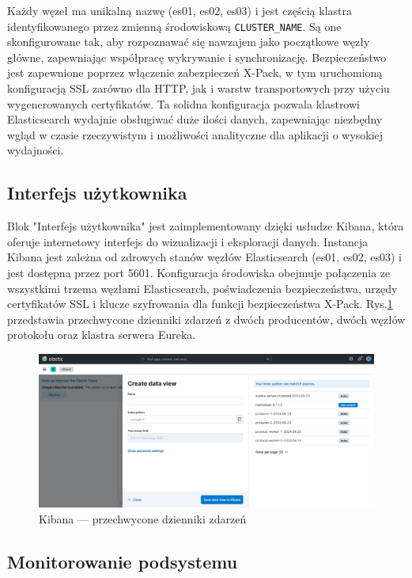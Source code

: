 Każdy węzeł ma unikalną nazwę (es01, es02, es03) i jest częścią klastra identyfikowanego przez zmienną środowiskową \verb|CLUSTER_NAME|. Są one skonfigurowane tak, aby rozpoznawać się nawzajem jako początkowe węzły główne, zapewniając współpracę wykrywanie i synchronizację. Bezpieczeństwo jest zapewnione poprzez włączenie zabezpieczeń X-Pack, w tym uruchomioną konfiguracją SSL zarówno dla HTTP, jak i warstw transportowych przy użyciu wygenerowanych certyfikatów. Ta solidna konfiguracja pozwala klastrowi Elasticsearch wydajnie obsługiwać duże ilości danych, zapewniając niezbędny wgląd w czasie rzeczywistym i możliwości analityczne dla aplikacji o wysokiej wydajności.

\subsection{Interfejs użytkownika}

Blok "Interfejs użytkownika" jest zaimplementowany dzięki usłudze Kibana, która oferuje internetowy interfejs do wizualizacji i eksploracji danych. Instancja Kibana jest zależna od zdrowych stanów węzłów Elasticsearch (es01, es02, es03) i jest dostępna przez port 5601. Konfiguracja środowiska obejmuje połączenia ze wszystkimi trzema węzłami Elasticsearch, poświadczenia bezpieczeństwa, urzędy certyfikatów SSL i klucze szyfrowania dla funkcji bezpieczeństwa X-Pack. Rys.\ref{kibanaDiscoveryDataView} przedstawia przechwycone dzienniki zdarzeń z dwóch producentów, dwóch węzłów protokołu oraz klastra serwera Eureka.

\begin{figure}[htbp!]
    \centering
    \includegraphics[width=\textwidth]{images/implementation/kibanaDiscoveryDataView.png}
    \caption{Kibana --- przechwycone dzienniki zdarzeń}
    \label{kibanaDiscoveryDataView}
\end{figure}

\subsection{Monitorowanie podsystemu}

